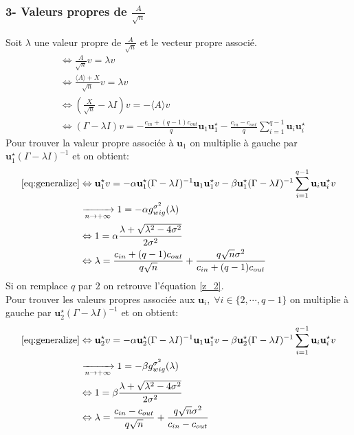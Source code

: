 \subsubsection*{3- Valeurs propres de $\frac{A}{\sqrt{n}}$}
Soit $\lambda$ une valeur propre de $\frac{A}{\sqrt{n}}$ et le vecteur propre associé.
\begin{align}
&\Leftrightarrow \frac{A}{\sqrt{n}}v =\lambda v \nonumber \\
&\Leftrightarrow \frac{\langle A \rangle + X}{\sqrt{n}}v =\lambda v \nonumber \\
&\Leftrightarrow (\frac{ X}{\sqrt{n}}- \lambda I )v = -\langle A \rangle v \nonumber \\
&\Leftrightarrow (\Gamma - \lambda I)v =-\frac{c_{in} + (q-1)c_{out}}{q} \mathbf{u}_1\mathbf{u}_1^{\star} - \frac{c_{in}-c_{out}}{q}\sum_{i=1}^{q-1}\mathbf{u}_i\mathbf{u}_i^{\star} \label{eq:generalize}
\end{align}
Pour trouver la valeur propre associée à $\mathbf{u}_1$ on multiplie à gauche par $\mathbf{u}_1^{\star}(\Gamma -\lambda I)^{-1}$ et on obtient:
\begin{align}
\eqref{eq:generalize} &\Leftrightarrow \mathbf{u}_1^{\star}v =-\alpha \mathbf{u}_1^{\star}(\Gamma -\lambda I)^{-1}\mathbf{u}_1\mathbf{u}_1^{\star}v - \beta \mathbf{u}_1^{\star}(\Gamma -\lambda I)^{-1}\sum_{i=1}^{q-1}\mathbf{u}_i\mathbf{u}_i^{\star}v \nonumber\\
&\xrightarrow[n \to +\infty]{} 1 = -\alpha g_{wig}^{\sigma^2}(\lambda) \nonumber\\
&\Leftrightarrow 1 = \alpha \frac{\lambda + \sqrt{\lambda^2 - 4\sigma^2}}{2\sigma^2} \nonumber\\
&\Leftrightarrow \lambda = \frac{c_{in} + (q-1)c_{out}}{q\sqrt{n}} + \frac{q\sqrt{n}\sigma^2}{c_{in} + (q-1)c_{out}} \label{eq:z_1 generalize}
\end{align}
Si on remplace $q$ par $2$ on retrouve l'équation \eqref{z_2}.\\
Pour trouver les valeurs propres associée aux $\mathbf{u}_i, \; \forall i \in \{2, \cdots, q-1\}$ on multiplie à gauche par $\mathbf{u}_2^{\star}(\Gamma -\lambda I)^{-1}$ et on obtient:
\begin{align}
\eqref{eq:generalize} &\Leftrightarrow \mathbf{u}_2^{\star}v =-\alpha \mathbf{u}_2^{\star}(\Gamma -\lambda I)^{-1}\mathbf{u}_1\mathbf{u}_1^{\star}v - \beta \mathbf{u}_2^{\star}(\Gamma -\lambda I)^{-1}\sum_{i=1}^{q-1}\mathbf{u}_i\mathbf{u}_i^{\star}v \nonumber\\
&\xrightarrow[n \to +\infty]{} 1 = -\beta g_{wig}^{\sigma^2}(\lambda) \nonumber\\
&\Leftrightarrow 1 = \beta \frac{\lambda + \sqrt{\lambda^2 - 4\sigma^2}}{2\sigma^2} \nonumber\\
&\Leftrightarrow \lambda = \frac{c_{in} - c_{out}}{q\sqrt{n}} + \frac{q\sqrt{n}\sigma^2}{c_{in} - c_{out}}\label{eq:z_2 generalize}
\end{align}
